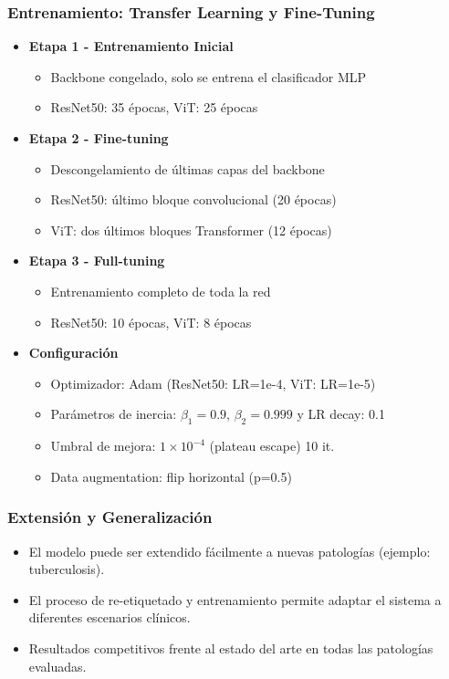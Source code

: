 \begin{frame}
\frametitle{Entrenamiento: Transfer Learning y Fine-Tuning}
\begin{itemize}
    \item \textbf{Etapa 1 - Entrenamiento Inicial}
    \begin{itemize}
        \item Backbone congelado, solo se entrena el clasificador MLP
        \item ResNet50: 35 épocas, ViT: 25 épocas
    \end{itemize}
    \item \textbf{Etapa 2 - Fine-tuning}
    \begin{itemize}
        \item Descongelamiento de últimas capas del backbone
        \item ResNet50: último bloque convolucional (20 épocas)
        \item ViT: dos últimos bloques Transformer (12 épocas)
    \end{itemize}
    \item \textbf{Etapa 3 - Full-tuning}
    \begin{itemize}
        \item Entrenamiento completo de toda la red
        \item ResNet50: 10 épocas, ViT: 8 épocas
    \end{itemize}
    \item \textbf{Configuración}
    \begin{itemize}
        \item Optimizador: Adam (ResNet50: LR=1e-4, ViT: LR=1e-5)
        \item Parámetros de inercia: $\beta_1=0.9$, $\beta_2=0.999$ y LR decay: 0.1
        \item Umbral de mejora: $1\times 10^{-4}$ (plateau escape) 10 it.
        \item Data augmentation: flip horizontal (p=0.5)
    \end{itemize}
\end{itemize}
\end{frame}

\begin{frame}
\frametitle{Extensión y Generalización}
\begin{itemize}
    \item El modelo puede ser extendido fácilmente a nuevas patologías (ejemplo: tuberculosis).
    \item El proceso de re-etiquetado y entrenamiento permite adaptar el sistema a diferentes escenarios clínicos.
    \item Resultados competitivos frente al estado del arte en todas las patologías evaluadas.
\end{itemize}
\end{frame}


